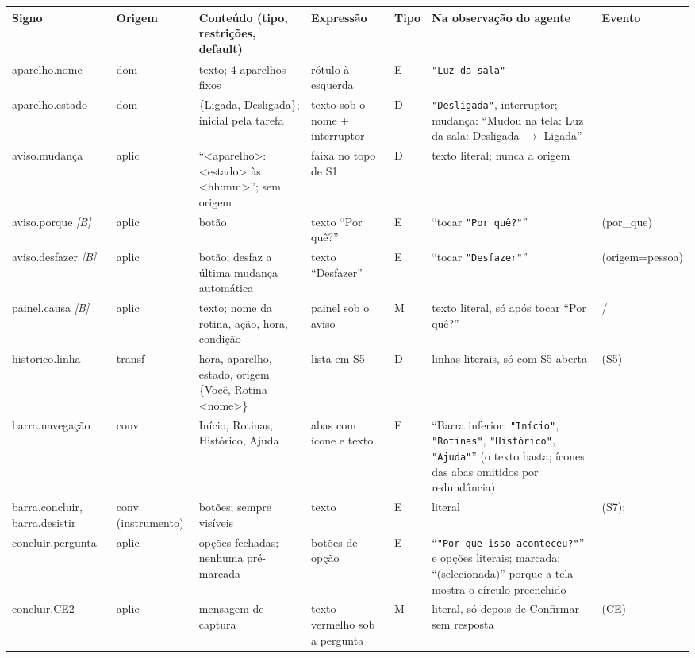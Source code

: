 \setlength{\tabcolsep}{3pt}
\begin{tabularx}{\textwidth}{@{}P{2.2cm}P{0.9cm}P{2.6cm}P{2.2cm}P{0.5cm}YP{2.3cm}@{}}
\toprule
\textbf{Signo} & \textbf{Origem} & \textbf{Conteúdo (tipo, restrições, default)} & \textbf{Expressão} & \textbf{Tipo} & \textbf{Na observação do agente} & \textbf{Evento} \\
\midrule
aparelho.nome & dom & texto; 4 aparelhos fixos & rótulo à esquerda & E & \texttt{"Luz da sala"} &  \\
aparelho.estado & dom & \{Ligada, Desligada\}; inicial pela tarefa & texto sob o nome + interruptor & D & \texttt{"Desligada"}, interruptor; mudança: ``Mudou na tela: Luz da sala: Desligada $\rightarrow$ Ligada'' &  \\
aviso.mudança & aplic & ``<aparelho>: <estado> às <hh:mm>''; sem origem & faixa no topo de S1 & D & texto literal; nunca a origem &  \\
aviso.porque \textit{[B]} & aplic & botão & texto ``Por quê?'' & E & ``tocar \texttt{"Por quê?"}'' &  (por\_que) \\
aviso.desfazer \textit{[B]} & aplic & botão; desfaz a última mudança automática & texto ``Desfazer'' & E & ``tocar \texttt{"Desfazer"}'' &  (origem=pessoa) \\
painel.causa \textit{[B]} & aplic & texto; nome da rotina, ação, hora, condição & painel sob o aviso & M & texto literal, só após tocar ``Por quê?'' & / \\
historico.linha & transf & hora, aparelho, estado, origem \{Você, Rotina <nome>\} & lista em S5 & D & linhas literais, só com S5 aberta & (S5) \\
barra.navegação & conv & Início, Rotinas, Histórico, Ajuda & abas com ícone e texto & E & ``Barra inferior: \texttt{"Início"}, \texttt{"Rotinas"}, \texttt{"Histórico"}, \texttt{"Ajuda"}'' (o texto basta; ícones das abas omitidos por redundância) &  \\
barra.concluir, barra.desistir & conv (instrumento) & botões; sempre visíveis & texto & E & literal & (S7);  \\
concluir.pergunta & aplic & opções fechadas; nenhuma pré-marcada & botões de opção & E & ``\texttt{"Por que isso aconteceu?"}'' e opções literais; marcada: ``(selecionada)'' porque a tela mostra o círculo preenchido &  \\
concluir.CE2 & aplic & mensagem de captura & texto vermelho sob a pergunta & M & literal, só depois de Confirmar sem resposta & (CE) \\
\bottomrule
\end{tabularx}
